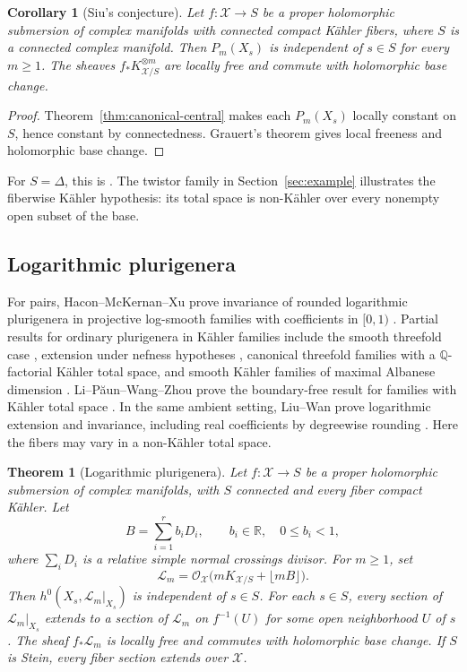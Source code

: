 \documentclass[11pt,a4paper]{article}
\numberwithin{equation}{section}
\newtheorem{corollary}[theorem]{Corollary}
\newtheorem{maintheorem}{Theorem}
\theoremstyle{definition}
\theoremstyle{remark}
\newcommand{\Q}{\mathbb Q}\newcommand{\R}{\mathbb R}
\newcommand{\OO}{\mathcal O}\newcommand{\cX}{\mathcal X}
\begin{document}
\begin{corollary}[Siu's conjecture]\label{cor:siu}\label{cor:canonical}
Let $f:\mathcal X\to S$ be a proper holomorphic submersion of complex manifolds with
connected compact Kähler fibers, where $S$ is a connected complex
manifold. Then $P_m(X_s)$ is independent of $s\in S$ for every
$m\ge1$. The sheaves $f_*K_{\mathcal X/S}^{\otimes m}$ are locally
free and commute with holomorphic base change.
\end{corollary}

\begin{proof}
Theorem~\ref{thm:canonical-central} makes each $P_m(X_s)$ locally
constant on $S$, hence constant by connectedness.
Grauert's theorem \cite{Grauert1960} gives local freeness and
holomorphic base change.
\end{proof}

For $S=\Delta$, this is \cite[Conjecture~0.4]{Siu2002}.
The twistor family in Section~\ref{sec:example} illustrates the
fiberwise Kähler hypothesis: its total space is non-Kähler over
every nonempty open subset of the base.

\subsection{Logarithmic plurigenera}

For pairs, Hacon--McKernan--Xu prove invariance of rounded logarithmic
plurigenera in projective log-smooth families with coefficients in
$[0,1)$ \cite[Theorem~4.2]{HMX2018}. Partial results for ordinary
plurigenera in Kähler families include the smooth threefold case
\cite[Theorem~1.8]{HLR2026}, extension under nefness hypotheses
\cite{DNWZ2026,CRW2026}, canonical threefold families with a
$\Q$-factorial Kähler total space, and smooth Kähler families of
maximal Albanese dimension \cite[\mbox{Theorems}~1.4--1.5]{FLR2026}.
Li--Păun--Wang--Zhou prove the boundary-free result for families with
Kähler total space \cite[Theorem~1.2]{LPWZ2026}. In the same ambient
setting, Liu--Wan prove logarithmic extension and invariance, including
real coefficients by degreewise rounding
\cite[Theorem~1.1 and Corollary~1.2]{LW2026}.
Here the fibers may vary in a non-Kähler total space.

\begin{maintheorem}[Logarithmic plurigenera]\label{thm:main}
Let $f:\mathcal X\to S$ be a proper holomorphic submersion of complex
manifolds, with $S$ connected and every fiber compact Kähler. Let
\[
 B=\sum_{i=1}^r b_iD_i,\qquad b_i\in\mathbb R,\quad 0\le b_i<1,
\]
where $\sum_iD_i$ is a relative simple normal crossings divisor.
For $m\ge1$, set
\[
 \mathcal L_m=\OO_{\mathcal X}
       \bigl(mK_{\mathcal X/S}+\lfloor mB\rfloor\bigr).
\]
Then $h^0(X_s,\mathcal L_m|_{X_s})$ is independent of $s\in S$.
For each $s\in S$, every section of $\mathcal L_m|_{X_s}$ extends
to a section of $\mathcal L_m$ on $f^{-1}(U)$ for some open
neighborhood $U$ of $s$. The sheaf $f_*\mathcal L_m$ is locally free
and commutes with holomorphic base change. If $S$ is Stein, every
fiber section extends over $\mathcal X$.
\end{maintheorem}
\end{document}
